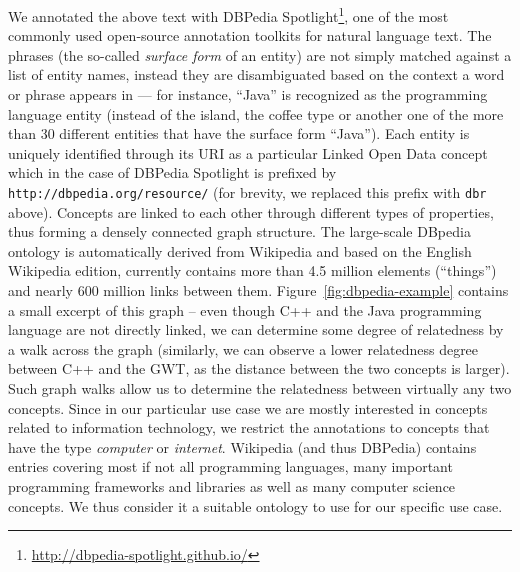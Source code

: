 \documentclass[conference]{IEEEtran}
\begin{document}
We annotated the above text with DBPedia
Spotlight\footnote{\url{http://dbpedia-spotlight.github.io/}}, one of the most
commonly used open-source annotation toolkits for natural language text. The
phrases (the so-called \emph{surface form} of an entity) are not simply matched
against a list of entity names, instead they are disambiguated based on the
context a word or phrase appears in --- for instance, ``Java'' is recognized as
the programming language entity (instead of the island, the coffee type or
another one of the more than 30 different entities that have the surface form
``Java''). Each entity is uniquely identified through its URI as a particular
Linked Open Data concept which in the case of DBPedia Spotlight is prefixed by
\texttt{http://dbpedia.org/resource/} (for brevity, we replaced this prefix with
\texttt{dbr} above).  Concepts are linked to each other through different types
of properties, thus forming a densely connected graph structure. The large-scale
DBpedia ontology is automatically derived from Wikipedia and based on the
English Wikipedia edition, currently contains more than 4.5 million elements
(``things'') and nearly 600 million links between them.
Figure~\ref{fig:dbpedia-example} contains a small excerpt of this graph -- even
though C++ and the Java programming language are not directly linked, we can
determine some degree of relatedness by a walk across the graph (similarly, we
can observe a lower relatedness degree between C++ and the GWT, as the distance
between the two concepts is larger). Such graph walks allow us to determine the
relatedness between virtually any two concepts.  Since in our particular use
case we are mostly interested in concepts related to information technology, we
restrict the annotations to concepts that have the type \emph{computer} or
\emph{internet}. Wikipedia (and thus DBPedia) contains entries covering most if
not all programming languages, many important programming frameworks and
libraries as well as many computer science concepts. We thus consider it a
suitable ontology to use for our specific use case.
\end{document}
